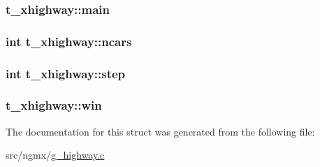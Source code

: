 \hypertarget{structt__xhighway_a4a0a527e870b4e166162b1bfb2909f2f}{
\subsubsection[{main}]{ {\bf t\-\_\-xhighway\-::main}}}\label{structt__xhighway_a4a0a527e870b4e166162b1bfb2909f2f}
\hypertarget{structt__xhighway_af59bb77cb0c8b569f9ea2d1e16bb5e37}{
\subsubsection[{ncars}]{\setlength{\rightskip}{0pt plus 5cm}int {\bf t\-\_\-xhighway\-::ncars}}}\label{structt__xhighway_af59bb77cb0c8b569f9ea2d1e16bb5e37}
\hypertarget{structt__xhighway_a2f80467b2cd4e82a936281f5f10ec9e4}{
\subsubsection[{step}]{\setlength{\rightskip}{0pt plus 5cm}int {\bf t\-\_\-xhighway\-::step}}}\label{structt__xhighway_a2f80467b2cd4e82a936281f5f10ec9e4}
\hypertarget{structt__xhighway_a0edd01f5c5bfae8decd82a7275084ff4}{
\subsubsection[{win}]{ {\bf t\-\_\-xhighway\-::win}}}\label{structt__xhighway_a0edd01f5c5bfae8decd82a7275084ff4}


\-The documentation for this struct was generated from the following file\-:\begin{DoxyCompactItemize}
\item 
src/ngmx/\hyperlink{g__highway_8c}{g\-\_\-highway.\-c}\end{DoxyCompactItemize}
